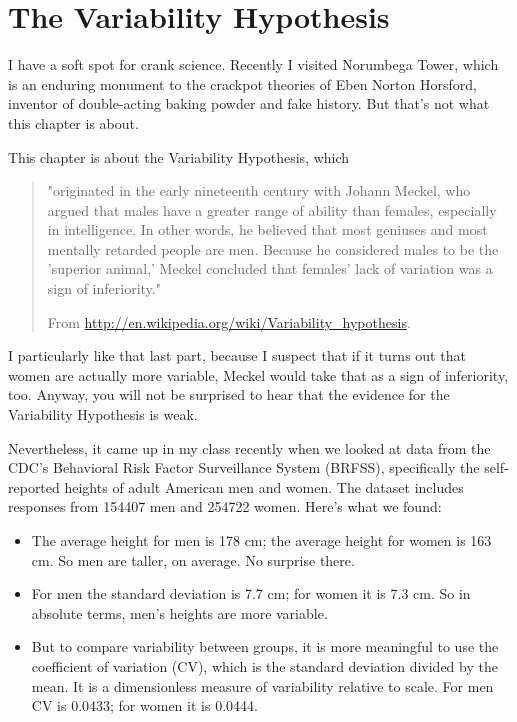 \documentclass[12pt]{book}
\theoremstyle{exercise}
\begin{document}
\section{The Variability Hypothesis}

I have a soft spot for crank science.  Recently I visited Norumbega
Tower, which is an enduring monument to the crackpot theories of Eben
Norton Horsford, inventor of double-acting baking powder and fake
history.  But that's not what this chapter is about.

This chapter is about the Variability Hypothesis, which

\begin{quote}
"originated in the early nineteenth century with Johann Meckel, who
  argued that males have a greater range of ability than females,
  especially in intelligence. In other words, he believed that most
  geniuses and most mentally retarded people are men. Because he
  considered males to be the 'superior animal,' Meckel concluded that
  females' lack of variation was a sign of inferiority."

From \url{http://en.wikipedia.org/wiki/Variability_hypothesis}.
\end{quote}

I particularly like that last part, because I suspect that if it turns
out that women are actually more variable, Meckel would take that as a
sign of inferiority, too.  Anyway, you will not be surprised to hear
that the evidence for the Variability Hypothesis is weak.

Nevertheless, it came up in my class recently when we looked at data
from the CDC's Behavioral Risk Factor Surveillance System (BRFSS),
specifically the self-reported heights of adult American men and women.
The dataset includes responses from 154407 men and 254722 women.
Here's what we found:

\begin{itemize}

\item The average height for men is 178 cm; the average height for
  women is 163 cm.  So men are taller, on average.  No surprise there.

\item For men the standard deviation is 7.7 cm; for women it is 7.3
  cm.  So in absolute terms, men's heights are more variable.

\item But to compare variability between groups, it is more meaningful
  to use the coefficient of variation (CV), which is the standard
  deviation divided by the mean.  It is a dimensionless measure of
  variability relative to scale.  For men CV is 0.0433; for women it
  is 0.0444.

\end{itemize}
\end{document}
